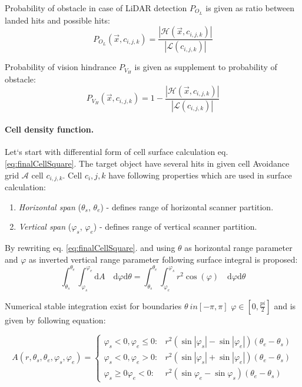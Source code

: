 \noindent Probability of obstacle in case of LiDAR detection $P_{O_L}$ is given as ratio between landed hits and possible hits:
\begin{equation}
    P_{O_L}(\vec{x},c_{i,j,k})=\frac{|\mathscr{H}(\vec{x},c_{i,j,k})|}{|\mathscr{L}(c_{i,j,k})|}
\end{equation}


\noindent Probability of vision hindrance $P_{V_H}$ is given as supplement to probability of obstacle:
\begin{equation}\label{eq:probabilityOfVisibilityHindrance}
    P_{V_H}(\vec{x},c_{i,j,k})=1-\frac{|\mathscr{H}(\vec{x},c_{i,j,k})|}{|\mathscr{L}(c_{i,j,k})|}
\end{equation}

\paragraph{Cell density function.}
\noindent Let`s start with differential form of cell surface calculation eq. \ref{eq:finalCellSquare}. The target object have several hits in given cell Avoidance grid $\mathscr{A}$ cell $c_{i,j,k}$. Cell $c_i,j,k$ have following properties which are used in surface calculation:
\begin{enumerate}
    \item \textit{Horizontal span} ($\theta_s$, $\theta_e$) - defines range of horizontal scanner partition.
    \item \textit{Vertical span} ($\varphi_s$, $\varphi_e$) - defines range of vertical scanner partition.
\end{enumerate}

\noindent By rewriting eq. \ref{eq:finalCellSquare}. and using $\theta$ as horizontal range parameter and $\varphi$ as inverted vertical range parameter following surface integral is proposed:
\begin{equation}
    \int_{\theta_s}^{\theta_e}\int_{\varphi_s}^{\varphi_e} \text{d}A \quad \text{d}\varphi\text{d}\theta = \int_{\theta_s}^{\theta_e}\int_{\varphi_e}^{\varphi_s} r^2 \cos(\varphi) \quad \text{d}\varphi\text{d}\theta
\end{equation}

\noindent Numerical stable integration exist for boundaries $\theta \ in [-\pi,\pi]$ $\varphi \in [0,\frac{pi}{2}]$ and is given by following equation:

\begin{equation}\label{eq:intersectionSurfaceForCell}
    A(r,\theta_s,\theta_e,\varphi_s,\varphi_e) = \left\{
    \begin{aligned}
        \varphi_s<0, \varphi_e\le0 :& r^2(\sin |\varphi_s| - \sin|\varphi_e|)(\theta_e-\theta_s)\\
        \varphi_s<0, \varphi_e>0   :& r^2(\sin |\varphi_s| + \sin|\varphi_e|)(\theta_e-\theta_s)\\
        \varphi_s\ge 0 \varphi_e<0 :& r^2(\sin \varphi_e - \sin\varphi_s)(\theta_e-\theta_s)
    \end{aligned}
    \right.
\end{equation}

